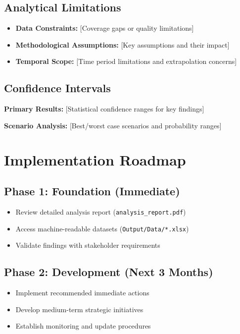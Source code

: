 \documentclass[11pt,letterpaper]{article}
\begin{document}
\subsection{Analytical Limitations}
\begin{itemize}
    \item \textbf{Data Constraints:} [Coverage gaps or quality limitations]
    \item \textbf{Methodological Assumptions:} [Key assumptions and their impact]
    \item \textbf{Temporal Scope:} [Time period limitations and extrapolation concerns]
\end{itemize}

\subsection{Confidence Intervals}
\textbf{Primary Results:} [Statistical confidence ranges for key findings]

\textbf{Scenario Analysis:} [Best/worst case scenarios and probability ranges]

\section{Implementation Roadmap}

\subsection{Phase 1: Foundation (Immediate)}
\begin{itemize}
    \item Review detailed analysis report (\texttt{analysis\_report.pdf})
    \item Access machine-readable datasets (\texttt{Output/Data/*.xlsx})
    \item Validate findings with stakeholder requirements
\end{itemize}

\subsection{Phase 2: Development (Next 3 Months)}
\begin{itemize}
    \item Implement recommended immediate actions
    \item Develop medium-term strategic initiatives
    \item Establish monitoring and update procedures
\end{itemize}
\end{document}
